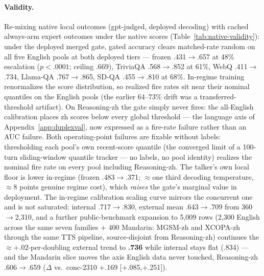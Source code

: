 \paragraph{Validity.} Re-mixing native local outcomes
(gpt-judged, deployed decoding) with cached always-arm expert
outcomes under the native scores
(Table~\ref{tab:native-validity}): under the deployed merged gate, gated accuracy clears matched-rate
random on all five English pools at both deployed tiers --- frozen
.431$\to$.657 at 48\% escalation ($p{<}.0001$; ceiling .669),
TriviaQA .568$\to$.852 at 61\%, WebQ .411$\to$.734, Llama-QA
.767$\to$.865, SD-QA .455$\to$.810 at 68\%. In-regime training
renormalizes the score distribution, so realized fire rates sit near
their nominal quantiles on the English pools (the earlier 64--73\%
drift was a transferred-threshold artifact). On Reasoning-zh the gate simply
never fires: the all-English calibration places zh scores below every
global threshold --- the language axis of
Appendix~\ref{app:duplexval}, now expressed as a fire-rate failure
rather than an AUC failure. Both operating-point failures are fixable
without labels: thresholding each pool's own recent-score quantile (the
converged limit of a 100-turn sliding-window quantile tracker --- no
labels, no pool identity) realizes the nominal fire rate on every pool
including Reasoning-zh. The talker's own local floor is lower
in-regime (frozen .483$\to$.371; $\approx$one third decoding
temperature, $\approx$8 points genuine regime cost), which
\emph{raises} the gate's marginal value in deployment. The in-regime
calibration scaling curve mirrors the concurrent one and is not
saturated: internal .717$\to$.830, external mean .643$\to$.709 from
360$\to$2{,}310, and a further public-benchmark expansion to 5{,}009
rows (2{,}300 English across the same seven families + 400 Mandarin:
MGSM-zh and XCOPA-zh through the same TTS pipeline, source-disjoint
from Reasoning-zh) continues the $\approx{+}.02$-per-doubling external
trend to \textbf{.736} while internal stays flat (.834) --- and the
Mandarin slice moves the axis English data never touched, Reasoning-zh
.606$\to$.659 ($\Delta$ vs.\ conc-2310 $+$.169 [$+$.085,$+$.251]).

